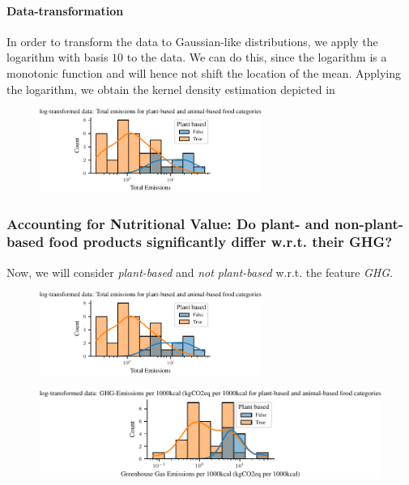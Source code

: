 \documentclass{article}
\begin{document}
\paragraph*{Data-transformation}
In order to transform the data to Gaussian-like distributions, we apply the logarithm with basis $10$ to the data. We can do this, since the logarithm is a monotonic function and will hence not shift the location of the mean. Applying the logarithm, we obtain the kernel density estimation depicted in  

\begin{figure}[h]
  \centering
  \includegraphics[width=0.65\textwidth]{figures/emissions-log.pdf}
  \label{fig:emissions-log}
\end{figure}


\subsubsection*{Accounting  for Nutritional Value: Do plant- and non-plant-based food products significantly differ w.r.t. their GHG?}


Now, we will consider \textit{plant-based} and \textit{not plant-based} w.r.t.  the feature \textit{GHG}.



\begin{figure}[h]
  \centering
  \includegraphics[width=0.65\textwidth]{figures/emissions-log.pdf}
  \label{fig:emissions-log}
\end{figure}

\begin{figure}[h]
    \centering
    \includegraphics{figures/ghg-log.pdf}
    \label{fig:ghg-log}
\end{figure}
\end{document}
